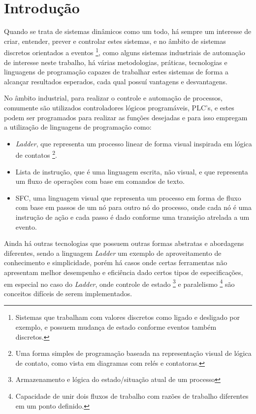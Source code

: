 \chapter{Introdução}

Quando se trata de sistemas dinâmicos como um todo, há sempre um interesse de criar, entender, prever e controlar estes sistemas, e no âmbito de sistemas discretos orientados a eventos \footnote{Sistemas que trabalham com valores discretos como ligado e desligado por exemplo, e possuem mudança de estado conforme eventos também discretos.}, como alguns sistemas industriais de automação de interesse neste trabalho, há várias metodologias, práticas, tecnologias e linguagens de programação capazes de trabalhar estes sistemas de forma a alcançar resultados esperados, cada qual possuí vantagens e desvantagens.

No âmbito industrial, para realizar o controle e automação de processos, comumente são utilizados controladores lógicos programáveis, PLC's, e estes podem ser programados para realizar as funções desejadas e para isso empregam a utilização de linguagens de programação como: 

\begin{itemize}
	\item \textit{Ladder}, que representa um processo linear de forma visual inspirada em lógica de contatos \footnote{Uma forma simples de programação baseada na representação visual de lógica de contato, como vista em diagramas com relés e contatoras.}.
	\item Lista de instrução, que é uma linguagem escrita, não visual, e que representa um fluxo de operações com base em comandos de texto.
	\item SFC, uma linguagem visual que representa um processo em forma de fluxo com base em passos de um nó para outro nó do processo, onde cada nó é uma instrução de ação e cada passo é dado conforme uma transição atrelada a um evento. 
\end{itemize}

Ainda há outras tecnologias que possuem outras formas abstratas e abordagens diferentes, sendo a linguagem \textit{Ladder} um exemplo de aproveitamento de conhecimento e simplicidade, porém há casos onde certas ferramentas não apresentam melhor desempenho e eficiência dado certos tipos de especificações, em especial no caso do \textit{Ladder}, onde controle de estado \footnote{Armazenamento e lógica do estado/situação atual de um processo} e paralelismo \footnote{Capacidade de unir dois fluxos de trabalho com razões de trabalho diferentes em um ponto definido.} são conceitos difíceis de serem implementados. 

